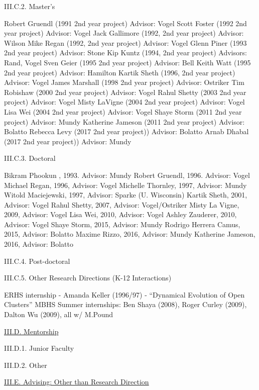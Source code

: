 \documentclass[11pt,letterpaper]{article}
\newcommand{\newi}{\newline\indent}
\begin{document}
          
III.C.2. Master's


Robert Gruendl (1991 2nd year project) Advisor:  Vogel\newi
Scott Foster (1992 2nd year project) Advisor:  Vogel\newi
Jack Gallimore (1992, 2nd year project) Advisor:  Wilson\newi
Mike Regan (1992, 2nd year project) Advisor: Vogel\newi
Glenn Piner (1993 2nd year project) Advisor: Stone\newi
Kip Kuntz (1994, 2nd year project) Advisors:  Rand, Vogel\newi
Sven Geier (1995 2nd year project) Advisor: Bell\newi
Keith Watt (1995 2nd year projcet) Advisor:  Hamilton\newi
Kartik Sheth (1996, 2nd year project) Advisor:  Vogel\newi
James Marshall (1998 2nd year project) Advisor:  Ostriker\newi
Tim Robishaw (2000  2nd year project)  Advisor:  Vogel\newi
Rahul Shetty (2003  2nd year project) Advisor:  Vogel\newi
Misty LaVigne (2004 2nd year project) Advisor: Vogel\newi
Lisa Wei (2004 2nd year project) Advisor: Vogel\newi
Shaye Storm (2011 2nd year project) Advisor: Mundy\newi
Katherine Jameson  (2011 2nd year project) Advisor: Bolatto\newi
Rebecca Levy (2017 2nd year project)) Advisor:  Bolatto\newi
Arnab Dhabal (2017 2nd year project)) Advisor: Mundy\newi
                
III.C.3. Doctoral

Bikram Phookun , 1993. Advisor: Mundy\newi
Robert Gruendl, 1996. Advisor: Vogel\newi
Michael Regan, 1996, Advisor: Vogel\newi
Michelle Thornley, 1997, Advisor: Mundy\newi
Witold Maciejewski, 1997, Advisor: Sparke (U. Wisconsin)\newi
Kartik Sheth, 2001, Advisor: Vogel\newi
Rahul Shetty, 2007, Advisor: Vogel/Ostriker\newi
Misty La Vigne, 2009, Advisor: Vogel\newi
Lisa Wei, 2010, Advisor: Vogel\newi
Ashley Zauderer, 2010, Advisor: Vogel\newi
Shaye Storm, 2015, Advisor: Mundy\newi
Rodrigo Herrera Camus, 2015, Advisor: Bolatto\newi
Maxime Rizzo, 2016, Advisor: Mundy\newi
Katherine Jameson, 2016, Advisor: Bolatto\newi
                
III.C.4. Post-doctoral


III.C.5. Other Research Directions (K-12 Interactions)

ERHS internship - Amanda Keller (1996/97) - ``Dynamical Evolution of  Open Clusters''\newi
MBHS Summer internships: Ben Shaya (2008), Roger Curley (2009), Dalton Wu  (2009), all w/ M.Pound\newi

\underline{III.D. Mentorship}

III.D.1. Junior Faculty

III.D.2. Other


\underline{III.E. Advising: Other than Research Direction}
\end{document}
